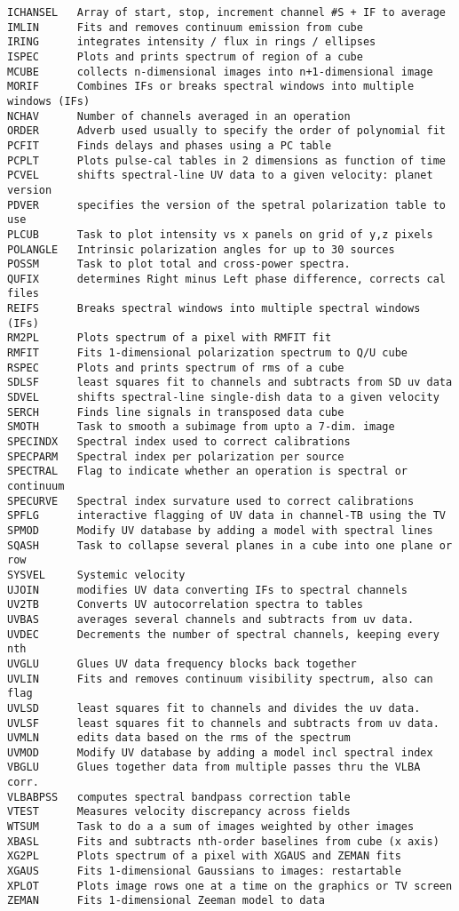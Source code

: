 \begin{verbatim}
ICHANSEL   Array of start, stop, increment channel #S + IF to average
IMLIN      Fits and removes continuum emission from cube
IRING      integrates intensity / flux in rings / ellipses
ISPEC      Plots and prints spectrum of region of a cube
MCUBE      collects n-dimensional images into n+1-dimensional image
MORIF      Combines IFs or breaks spectral windows into multiple windows (IFs)
NCHAV      Number of channels averaged in an operation
ORDER      Adverb used usually to specify the order of polynomial fit
PCFIT      Finds delays and phases using a PC table
PCPLT      Plots pulse-cal tables in 2 dimensions as function of time
PCVEL      shifts spectral-line UV data to a given velocity: planet version
PDVER      specifies the version of the spetral polarization table to use
PLCUB      Task to plot intensity vs x panels on grid of y,z pixels
POLANGLE   Intrinsic polarization angles for up to 30 sources
POSSM      Task to plot total and cross-power spectra.
QUFIX      determines Right minus Left phase difference, corrects cal files
REIFS      Breaks spectral windows into multiple spectral windows (IFs)
RM2PL      Plots spectrum of a pixel with RMFIT fit
RMFIT      Fits 1-dimensional polarization spectrum to Q/U cube
RSPEC      Plots and prints spectrum of rms of a cube
SDLSF      least squares fit to channels and subtracts from SD uv data
SDVEL      shifts spectral-line single-dish data to a given velocity
SERCH      Finds line signals in transposed data cube
SMOTH      Task to smooth a subimage from upto a 7-dim. image
SPECINDX   Spectral index used to correct calibrations
SPECPARM   Spectral index per polarization per source
SPECTRAL   Flag to indicate whether an operation is spectral or continuum
SPECURVE   Spectral index survature used to correct calibrations
SPFLG      interactive flagging of UV data in channel-TB using the TV
SPMOD      Modify UV database by adding a model with spectral lines
SQASH      Task to collapse several planes in a cube into one plane or row
SYSVEL     Systemic velocity
UJOIN      modifies UV data converting IFs to spectral channels
UV2TB      Converts UV autocorrelation spectra to tables
UVBAS      averages several channels and subtracts from uv data.
UVDEC      Decrements the number of spectral channels, keeping every nth
UVGLU      Glues UV data frequency blocks back together
UVLIN      Fits and removes continuum visibility spectrum, also can flag
UVLSD      least squares fit to channels and divides the uv data.
UVLSF      least squares fit to channels and subtracts from uv data.
UVMLN      edits data based on the rms of the spectrum
UVMOD      Modify UV database by adding a model incl spectral index
VBGLU      Glues together data from multiple passes thru the VLBA corr.
VLBABPSS   computes spectral bandpass correction table
VTEST      Measures velocity discrepancy across fields
WTSUM      Task to do a a sum of images weighted by other images
XBASL      Fits and subtracts nth-order baselines from cube (x axis)
XG2PL      Plots spectrum of a pixel with XGAUS and ZEMAN fits
XGAUS      Fits 1-dimensional Gaussians to images: restartable
XPLOT      Plots image rows one at a time on the graphics or TV screen
ZEMAN      Fits 1-dimensional Zeeman model to data
\end{verbatim}\eve

